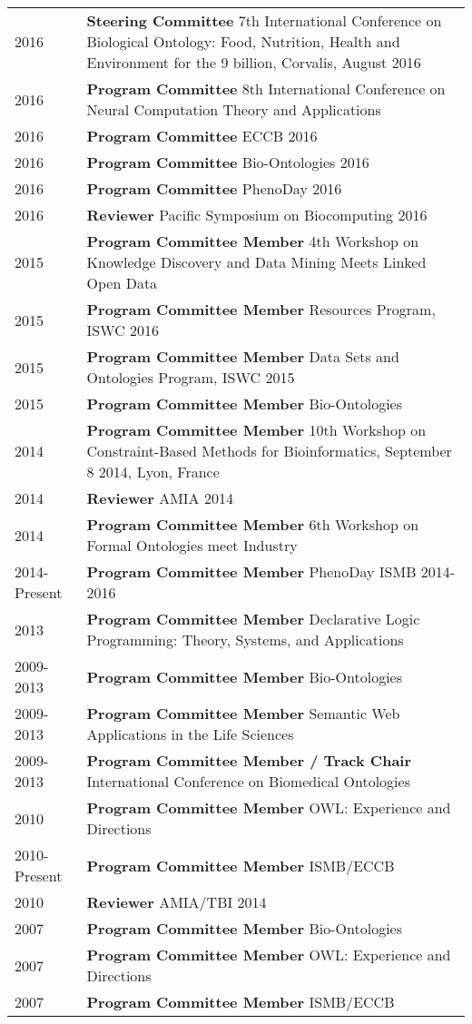 \documentclass[11pt,fullpage]{article}
\begin{document}
\begin{longtable}{p{0.5in}|p{5.5in}}

  2016  & \textbf{Steering Committee}  7th International Conference on Biological Ontology: Food, Nutrition, Health and Environment for the 9 billion, Corvalis, August 2016 \\
  2016  & \textbf{Program Committee}  8th International Conference on Neural Computation Theory and Applications \\
  2016  & \textbf{Program Committee}  ECCB 2016 \\
  2016  & \textbf{Program Committee}  Bio-Ontologies 2016 \\
  2016  & \textbf{Program Committee}  PhenoDay 2016 \\
  2016  & \textbf{Reviewer}  Pacific Symposium on Biocomputing 2016 \\
  2015  & \textbf{Program Committee Member}  4th Workshop on Knowledge Discovery and Data Mining Meets Linked Open Data \\
  2015  & \textbf{Program Committee Member}  Resources Program, ISWC 2016 \\
  2015  & \textbf{Program Committee Member}  Data Sets and Ontologies Program, ISWC 2015 \\
  2015  & \textbf{Program Committee Member} Bio-Ontologies \\
  2014  & \textbf{Program Committee Member} 10th Workshop on Constraint-Based Methods for Bioinformatics, September 8 2014, Lyon, France \\
  2014  & \textbf{Reviewer} AMIA 2014 \\
  2014 & \textbf{Program Committee Member} 6th Workshop on Formal Ontologies meet Industry\\
  2014-Present & \textbf{Program Committee Member} PhenoDay ISMB 2014-2016\\
  2013  & \textbf{Program Committee Member} Declarative Logic Programming: Theory, Systems, and Applications \\
  2009-2013  & \textbf{Program Committee Member} Bio-Ontologies \\
  2009-2013 & \textbf{Program Committee Member} Semantic Web  Applications in the Life Sciences\\
  2009-2013 & \textbf{Program Committee Member / Track Chair} International Conference on Biomedical Ontologies\\
  2010 & \textbf{Program Committee Member} OWL: Experience and Directions \\
  2010-Present & \textbf{Program Committee Member} ISMB/ECCB \\
  2010  & \textbf{Reviewer} AMIA/TBI 2014 \\
  2007 & \textbf{Program Committee Member} Bio-Ontologies \\
  2007 & \textbf{Program Committee Member} OWL: Experience and Directions \\
  2007 & \textbf{Program Committee Member} ISMB/ECCB \\

\end{longtable}
\end{document}
